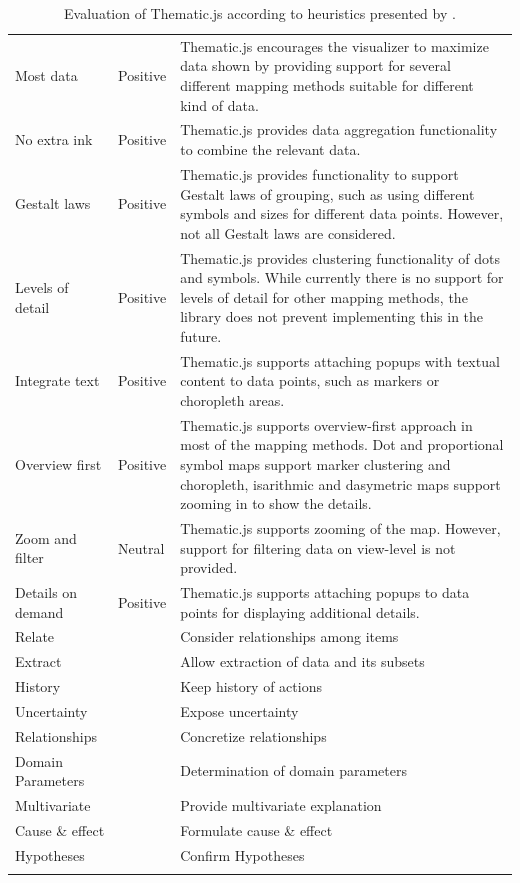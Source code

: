 \begin{longtable}{|p{3cm}|p{2.2cm}|p{7.8cm}|}
Most data & Positive & Thematic.js encourages the visualizer to maximize data shown by providing support for several different mapping methods suitable for different kind of data. \\[0.5em] %
No extra ink & Positive & Thematic.js provides data aggregation functionality to combine the relevant data. \\[0.5em] %
Gestalt laws & Positive & Thematic.js provides functionality to support Gestalt laws of grouping, such as using different symbols and sizes for different data points. However, not all Gestalt laws are considered. \\[0.5em] %
Levels of detail & Positive & Thematic.js provides clustering functionality of dots and symbols. While currently there is no support for levels of detail for other mapping methods, the library does not prevent implementing this in the future. \\[0.5em] %
Integrate text & Positive & Thematic.js supports attaching popups with textual content to data points, such as markers or choropleth areas. \\[0.5em]
Overview first & Positive & Thematic.js supports overview-first approach in most of the mapping methods. Dot and proportional symbol maps support marker clustering and choropleth, isarithmic and dasymetric maps support zooming in to show the details. \\[0.5em] %
Zoom and filter & Neutral & Thematic.js supports zooming of the map. However, support for filtering data on view-level is not provided. \\[0.5em]
Details on demand & Positive & Thematic.js supports attaching popups to data points for displaying additional details. \\[0.5em]
Relate & & Consider relationships among items \\[0.5em]
Extract & & Allow extraction of data and its subsets \\[0.5em]
History & & Keep history of actions \\[0.5em]
Uncertainty & & Expose uncertainty \\[0.5em]
Relationships & & Concretize relationships \\[0.5em]
Domain Parameters & & Determination of domain parameters \\[0.5em]
Multivariate & & Provide multivariate explanation \\[0.5em]
Cause \& effect & & Formulate cause \& effect \\[0.5em]
Hypotheses & & Confirm Hypotheses \\[0.5em]
\hline
\caption{Evaluation of Thematic.js according to heuristics presented by \citet{zuk_heuristics_2006}.}
\label{table:heuristicsevaluation}
\end{longtable}

